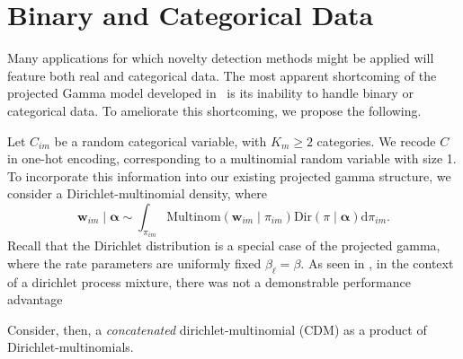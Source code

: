 \section{Binary and Categorical Data}
Many applications for which novelty detection methods might be applied will 
    feature both real and categorical data.   The most apparent 
    shortcoming of the projected Gamma model developed in~\cite{trubey:pg} is
    its inability to handle binary or categorical data.  To ameliorate this 
    shortcoming, we propose the following.

Let $C_{im}$ be a random categorical variable, with $K_m \geq 2$ categories.
  We recode $C$ in one-hot encoding, corresponding to a multinomial random
  variable with size 1.  To incorporate this information into our existing
  projected gamma structure, we consider a Dirichlet-multinomial density,
  where 
  \begin{equation*}
    \bm{w}_{im}\mid\bm{\alpha} 
    \sim 
    \int_{\pi_{im}} 
    \text{Multinom}(\bm{w}_{im}\mid\pi_{im})
    \text{Dir}(\pi\mid\bm{\alpha})\text{d}\pi_{im}.
  \end{equation*}
  Recall that the Dirichlet distribution is a special case of the projected gamma,
  where the rate parameters are uniformly fixed $\beta_{\ell} = \beta$.  As seen
  in \cite{trubey:pg}, in the context of a dirichlet process mixture, there was
  not a demonstrable performance advantage 
  
  
  
  Consider,
  then, a \emph{concatenated} dirichlet-multinomial (CDM) as a product of
  Dirichlet-multinomials. 


